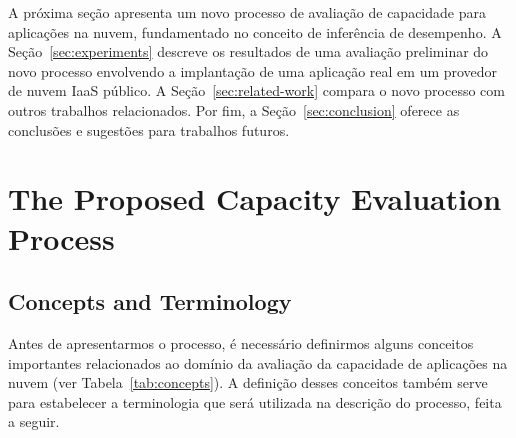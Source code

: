 \documentclass[10pt,conference,compsocconf]{IEEEtran}
\begin{document}
A próxima seção apresenta um novo processo de avaliação de capacidade para aplicações na nuvem, fundamentado no conceito de inferência de desempenho. A Seção~\ref{sec:experiments} descreve os resultados de uma avaliação preliminar do novo processo envolvendo a implantação de uma aplicação real em um provedor de nuvem IaaS público. A Seção~\ref{sec:related-work} compara o novo processo com outros trabalhos relacionados. Por fim, a Seção~\ref{sec:conclusion} oferece as conclusões e sugestões para trabalhos futuros.


\section{The Proposed Capacity Evaluation Process}\label{sec:process}

\subsection{Concepts and Terminology}

Antes de apresentarmos o processo, é necessário definirmos alguns conceitos importantes relacionados ao domínio da avaliação da capacidade de aplicações na nuvem (ver \mbox{Tabela~\ref{tab:concepts}}). A definição desses conceitos também serve para estabelecer a terminologia que será utilizada na descrição do processo, feita a seguir.
\end{document}
